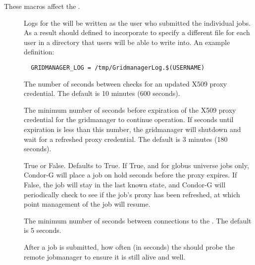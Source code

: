 These macros affect the .
\begin{description}

\item[]
\label{param:GridmanagerLog} Logs for the  
  will be written as the user who submitted the individual jobs.
  As a result  should defined to incorporate
   to specify a different file for each user
  in a directory that users will be able to write into.
  An example definition:
\footnotesize
\begin{verbatim}
  GRIDMANAGER_LOG = /tmp/GridmanagerLog.$(USERNAME)
\end{verbatim}
\normalsize

\item[]
\label{param:GridmanagerCheckproxyInterval} The number of seconds
between checks for an updated X509 proxy credential. The default
is 10 minutes (600 seconds).

\item[]
\label{param:GridmanagerMinimumProxyTime} The minimum number of
seconds before expiration of the X509 proxy credential for the
gridmanager to continue operation. If seconds until expiration is
less than this number, the gridmanager will shutdown and wait for
a refreshed proxy credential. The default is 3 minutes (180 seconds).

\item[]
\label{param:HoldJobIfCredentialExpires} True or False.
Defaults to True.
If True, and for globus universe jobs only,
Condor-G will place a job on hold
 seconds
before the proxy expires.
If False,
the job will stay in the last known state,
and Condor-G will periodically check to see if the job's proxy has been
refreshed, at which point management of the job will resume.

\item[]
\label{param:GridmanagerContactScheddDelay} The minimum number of
seconds between connections to the . The default is 5 seconds.

\item[]
\label{param:GridmanagerJobProbeInterval}
After a job is submitted, how often (in seconds) the 
should probe the remote jobmanager to ensure it is still alive and well.


\end{description}
